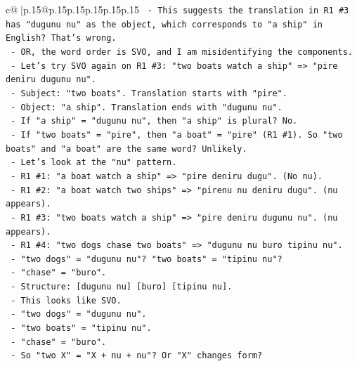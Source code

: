 \documentclass{article}
\begin{document}
{\begin{supertabular}{c@{$\;$}|p{.15\linewidth}@{}p{.15\linewidth}p{.15\linewidth}p{.15\linewidth}p{.15\linewidth}p{.15\linewidth}}
{{{\texttt{                  {-} This suggests the translation in R1 \#3 has "dugunu nu" as the object, which corresponds to "a ship" in English? That's wrong.} \\
\texttt{                  {-} OR, the word order is SVO, and I am misidentifying the components.} \\
\texttt{                  {-} Let's try SVO again on R1 \#3: "two boats watch a ship" => "pire deniru dugunu nu".} \\
\texttt{                    {-} Subject: "two boats". Translation starts with "pire".} \\
\texttt{                    {-} Object: "a ship". Translation ends with "dugunu nu".} \\
\texttt{                    {-} If "a ship" = "dugunu nu", then "a ship" is plural? No.} \\
\texttt{                    {-} If "two boats" = "pire", then "a boat" = "pire" (R1 \#1). So "two boats" and "a boat" are the same word? Unlikely.} \\
\texttt{                {-} Let's look at the "nu" pattern.} \\
\texttt{                  {-} R1 \#1: "a boat watch a ship" => "pire deniru dugu". (No nu).} \\
\texttt{                  {-} R1 \#2: "a boat watch two ships" => "pirenu nu deniru dugu". (nu appears).} \\
\texttt{                  {-} R1 \#3: "two boats watch a ship" => "pire deniru dugunu nu". (nu appears).} \\
\texttt{                  {-} R1 \#4: "two dogs chase two boats" => "dugunu nu buro tipinu nu".} \\
\texttt{                    {-} "two dogs" = "dugunu nu"? "two boats" = "tipinu nu"?} \\
\texttt{                    {-} "chase" = "buro".} \\
\texttt{                    {-} Structure: {[}dugunu nu{]} {[}buro{]} {[}tipinu nu{]}.} \\
\texttt{                    {-} This looks like SVO.} \\
\texttt{                    {-} "two dogs" = "dugunu nu".} \\
\texttt{                    {-} "two boats" = "tipinu nu".} \\
\texttt{                    {-} "chase" = "buro".} \\
\texttt{                    {-} So "two X" = "X + nu + nu"? Or "X" changes form?} \\
}}}
\end{supertabular}}
\end{document}
